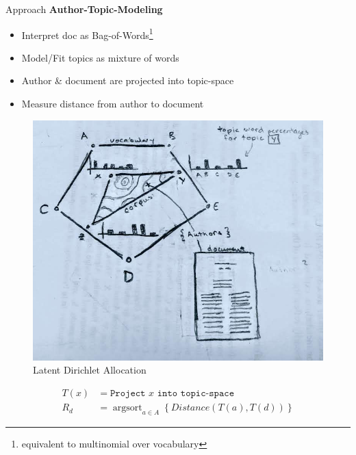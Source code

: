 \documentclass[10pt]{beamer}
\DeclareMathOperator*{\argsort}{argsort}
\begin{document}
\begin{frame}{Approach}
  {\bf Author-Topic-Modeling}


  \begin{multicols}{2}

  \begin{itemize}
  \item Interpret doc as Bag-of-Words\footnote{equivalent to multinomial over vocabulary}
  \item Model/Fit topics as mixture of words
  \item Author \& document are projected into topic-space
  \item Measure distance from author to document
  \end{itemize}

  \begin{figure}
  \includegraphics[width=\columnwidth]{./lda-draw.jpg}
  \caption{Latent Dirichlet Allocation}
  \end{figure}

  \end{multicols}

  \vspace{-2em}
  \begin{align*}
    T(x) &= \texttt{Project $x$ into topic-space} \\
    R_d &= \argsort_{a\in A} \left\{Distance(T(a),T(d))\right\}
  \end{align*}

\end{frame}
\end{document}
